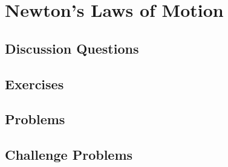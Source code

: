 
\chapter{Newton's Laws of Motion}

\section{Discussion Questions}

\section{Exercises}

\section{Problems}

\section{Challenge Problems}
